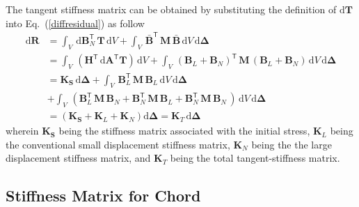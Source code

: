 The tangent stiffness matrix can be obtained by substituting the definition of $\mathrm{d} \mathbf{T}$ into Eq.~(\ref{diffresidual}) as follow 
\begin{equation}
\begin{aligned}
\mathrm{d} \mathbf{R} & = \int_{V} \, \mathrm{d} \mathbf{B}_N^{\mathsf{T}} \, \mathbf{T} \, \mathrm{d} V + \int_{V} \, \bar{\mathbf{B}}^{\mathsf{T}} \, \mathbf{M} \, \bar{\mathbf{B}} \, \mathrm{d} V \, \mathrm{d} \boldsymbol{\Delta} \\ 
& = \int_{V} \,  (\mathbf{H}^{\mathsf{T}} \, \mathrm{d} \mathbf{A}^{\mathsf{T}} \mathbf{T}) \, \mathrm{d} V + \int_{V} \, \left(\mathbf{B}_L + \mathbf{B}_N \right)^{\mathsf{T}} \, \mathbf{M} \,  \left(\mathbf{B}_L + \mathbf{B}_N \right) \, \mathrm{d} V \, \mathrm{d} \boldsymbol{\Delta} \\ 
& = \mathbf{K}_\mathbf{S}  \, \mathrm{d} \boldsymbol{\Delta} + \int_{V} \, \mathbf{B}_L^{\mathsf{T}} \, \mathbf{M} \, \mathbf{B}_L \, \mathrm{d} V \, \mathrm{d} \boldsymbol{\Delta}\\ 
& + \int_{V} \,  \left(\mathbf{B}_L^{\mathsf{T}} \, \mathbf{M} \, \mathbf{B}_N + \mathbf{B}_N^{\mathsf{T}} \, \mathbf{M} \, \mathbf{B}_L + \mathbf{B}_N^{\mathsf{T}} \, \mathbf{M} \, \mathbf{B}_N \, \right) \, \mathrm{d} V \, \mathrm{d} \boldsymbol{\Delta}\\
& = \left(\mathbf{K}_\mathbf{S} + \mathbf{K}_L + \mathbf{K}_N\right)\mathrm{d} \boldsymbol{\Delta} = \mathbf{K}_T \, \mathrm{d} \boldsymbol{\Delta}
\end{aligned} 
\end{equation} 
wherein $\mathbf{K}_\mathbf{S}$ being the stiffness matrix associated with the initial stress, $\mathbf{K}_L$ being the conventional small displacement stiffness matrix, $\mathbf{K}_N$ being the the large displacement stiffness matrix, and $\mathbf{K}_T$ being the total tangent-stiffness matrix. 

\subsection{Stiffness Matrix for Chord}

